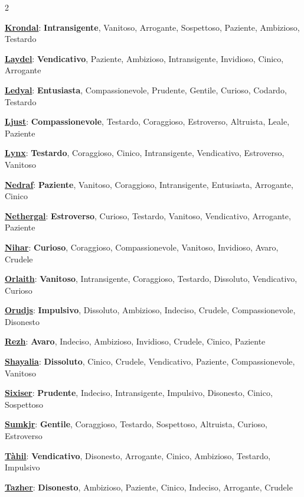 \begin{multicols}{2}
{\textbf{\hyperlink{krondal}{Krondal}}: \textbf{Intransigente}, Vanitoso, Arrogante, Sospettoso, Paziente, Ambizioso, Testardo

\smallskip
\textbf{\hyperlink{laydel}{Laydel}}: \textbf{Vendicativo}, Paziente, Ambizioso, Intransigente, Invidioso, Cinico, Arrogante

\smallskip
\textbf{\hyperlink{ledyal}{Ledyal}}: \textbf{Entusiasta}, Compassionevole, Prudente, Gentile, Curioso, Codardo, Testardo

\smallskip
\textbf{\hyperlink{ljust}{Ljust}}: \textbf{Compassionevole}, Testardo, Coraggioso, Estroverso, Altruista, Leale, Paziente

\smallskip
\textbf{\hyperlink{lynx}{Lynx}}: \textbf{Testardo}, Coraggioso, Cinico, Intransigente, Vendicativo, Estroverso, Vanitoso

\smallskip
\textbf{\hyperlink{nedraf}{Nedraf}}: \textbf{Paziente}, Vanitoso, Coraggioso, Intransigente, Entusiasta, Arrogante, Cinico

\smallskip
\textbf{\hyperlink{nethergal}{Nethergal}}: \textbf{Estroverso}, Curioso, Testardo, Vanitoso, Vendicativo, Arrogante, Paziente

\smallskip
\textbf{\hyperlink{nihar}{Nihar}}: \textbf{Curioso}, Coraggioso, Compassionevole, Vanitoso, Invidioso, Avaro, Crudele

\smallskip
\textbf{\hyperlink{orlaith}{Orlaith}}: \textbf{Vanitoso}, Intransigente, Coraggioso, Testardo, Dissoluto, Vendicativo, Curioso

\smallskip
\textbf{\hyperlink{orudjs}{Orudjs}}: \textbf{Impulsivo}, Dissoluto, Ambizioso, Indeciso, Crudele, Compassionevole, Disonesto

\smallskip
\textbf{\hyperlink{rezh}{Rezh}}: \textbf{Avaro}, Indeciso, Ambizioso, Invidioso, Crudele, Cinico, Paziente

\smallskip
\textbf{\hyperlink{shayalia}{Shayalia}}: \textbf{Dissoluto}, Cinico, Crudele, Vendicativo, Paziente, Compassionevole, Vanitoso

\smallskip
\textbf{\hyperlink{sixiser}{Sixiser}}: \textbf{Prudente}, Indeciso, Intransigente, Impulsivo, Disonesto, Cinico, Sospettoso

\smallskip
\textbf{\hyperlink{sumkjr}{Sumkjr}}: \textbf{Gentile}, Coraggioso, Testardo, Sospettoso, Altruista, Curioso, Estroverso

\smallskip
\textbf{\hyperlink{tahil}{Tàhil}}: \textbf{Vendicativo}, Disonesto, Arrogante, Cinico, Ambizioso, Testardo, Impulsivo

\smallskip
\textbf{\hyperlink{tazher}{Tazher}}: \textbf{Disonesto}, Ambizioso, Paziente, Cinico, Indeciso, Arrogante, Crudele

}
\end{multicols}

